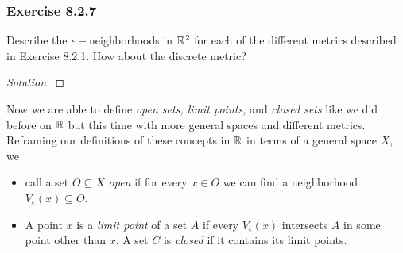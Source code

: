 \subsubsection{Exercise 8.2.7} Describe the \( \epsilon - \)neighborhoods in \( \mathbb{R}^{2} \) for each of the different metrics described in Exercise 8.2.1. How about the discrete metric?
\begin{proof}[Solution]

\end{proof}

Now we are able to define \textit{open sets, limit points,} and \textit{closed sets} like we did before on \( \mathbb{R}  \) but this time with more general spaces and different metrics. 
Reframing our definitions of these concepts in \( \mathbb{R}  \) in terms of a general space \( X  \), we 
\begin{itemize}
    \item call a set \( O \subseteq X  \) \textit{open} if for every \( x \in O  \) we can find a neighborhood \( V_{\epsilon }(x) \subseteq O  \). 
    \item A point \( x  \) is a \textit{limit point} of a set \( A  \) if every \( V_{\epsilon }(x)  \) intersects \( A  \) in some point other than \( x  \). A set \( C  \) is \textit{closed} if it contains its limit points.
\end{itemize}

